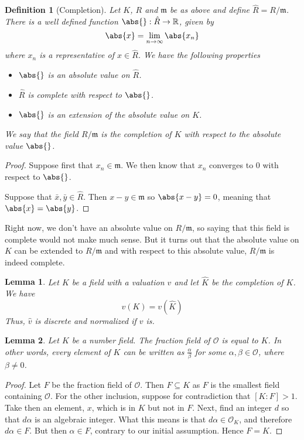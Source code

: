 \documentclass{article}
\newtheorem{definition}{Definition}[section]
\newtheorem{lemma}{Lemma}[section]
\newcommand{\mfrak}[1]{\mathfrak{#1}}
\newcommand{\mcal}[1]{\mathcal{#1}}
\newcommand{\mbb}[1]{\mathbb{#1}}
\begin{document}
\begin{definition}[Completion]
    Let $K$, $R$ and $\mfrak m$ be as above and define $\hat R = R / \mfrak m$. There is a well defined function $\abs{} : \hat R \to \mbb R$, given by
    $$\abs{x} = \lim_{n \to \infty} \abs{x_n}$$
    where $x_n$ is a representative of $x \in \hat R$. We have the following properties
    \begin{itemize}
        \item $\abs{}$ is an absolute value on $\hat R$.
        \item $\hat R$ is complete with respect to $\abs{}$.
        \item $\abs {}$ is an extension of the absolute value on $K$.
    \end{itemize}
    We say that the field $R / \mfrak m$ is the completion of $K$ with respect to the absolute value $\abs{}$.
\end{definition}
\begin{proof}
    Suppose first that $x_n \in \mfrak m$. We then know that $x_n$ converges to 0 with respect to $\abs{}$. 
    
    Suppose that $\bar x, \bar y \in \hat R$. Then $x - y \in \mfrak m$ so $\abs{x - y} = 0$, meaning that $\abs{x} = \abs{y}$. 
\end{proof}


Right now, we don't have an absolute value on $R / \mfrak m$, so saying that this field is complete would not make much sense. But it turns out that the absolute value on $K$ can be extended to $R / \mfrak m$ and with respect to this absolute value, $R / \mfrak m$ is indeed complete.


\begin{lemma} \label{lem: Image of valuation and completed valuation are the same}
    Let $K$ be a field with a valuation $v$ and let $\hat K$ be the completion of $K$. We have 
    $$v(K) = v(\hat K)$$
    Thus, $\hat v$ is discrete and normalized if $v$ is.
\end{lemma}


\begin{lemma} \label{lem: Fraction field of ring of integers is number field}
    Let $K$ be a number field. The fraction field of $\mcal O$ is equal to $K$. In other words, every element of $K$ can be written as $\frac{\alpha}{\beta}$ for some $\alpha, \beta \in \mcal O$, where $\beta \neq 0$.
\end{lemma}
\begin{proof}
    Let $F$ be the fraction field of $\mcal O$. Then $F \subseteq K$ as $F$ is the smallest field containing $\mcal O$. For the other inclusion, suppose for contradiction that $[K : F] > 1$. Take then an element, $x$, which is in $K$ but not in $F$. Next, find an integer $d$ so that $d \alpha$ is an algebraic integer. What this means is that $d \alpha \in \mcal O_K$, and therefore $d \alpha \in F$. But then $\alpha \in F$, contrary to our initial assumption. Hence $F = K$.
\end{proof}
\end{document}

